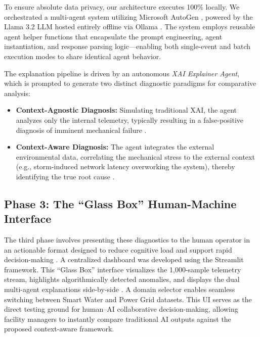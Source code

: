 \documentclass[a4paper,fleqn]{cas-dc}
\begin{document}
To ensure absolute data privacy, our architecture executes 100\% locally. We orchestrated a multi-agent system utilizing Microsoft AutoGen \cite{ref_autogen}, powered by the Llama 3.2 LLM hosted entirely offline via Ollama \cite{ref_llama}. The system employs reusable agent helper functions that encapsulate the prompt engineering, agent instantiation, and response parsing logic---enabling both single-event and batch execution modes to share identical agent behavior.

The explanation pipeline is driven by an autonomous \textit{XAI Explainer Agent}, which is prompted to generate two distinct diagnostic paradigms for comparative analysis:
\begin{itemize}
    \item \textbf{Context-Agnostic Diagnosis:} Simulating traditional XAI, the agent analyzes only the internal telemetry, typically resulting in a false-positive diagnosis of imminent mechanical failure \cite{ref16}.
    \item \textbf{Context-Aware Diagnosis:} The agent integrates the external environmental data, correlating the mechanical stress to the external context (e.g., storm-induced network latency overworking the system), thereby identifying the true root cause \cite{ref6}.
\end{itemize}

\subsection{Phase 3: The ``Glass Box'' Human-Machine Interface}
The third phase involves presenting these diagnostics to the human operator in an actionable format designed to reduce cognitive load and support rapid decision-making \cite{ref_cognitive_bias}. A centralized dashboard was developed using the Streamlit framework. This ``Glass Box'' interface visualizes the 1,000-sample telemetry stream, highlights algorithmically detected anomalies, and displays the dual multi-agent explanations side-by-side \cite{ref15, ref21}. A domain selector enables seamless switching between Smart Water and Power Grid datasets. This UI serves as the direct testing ground for human--AI collaborative decision-making, allowing facility managers to instantly compare traditional AI outputs against the proposed context-aware framework.
\end{document}
